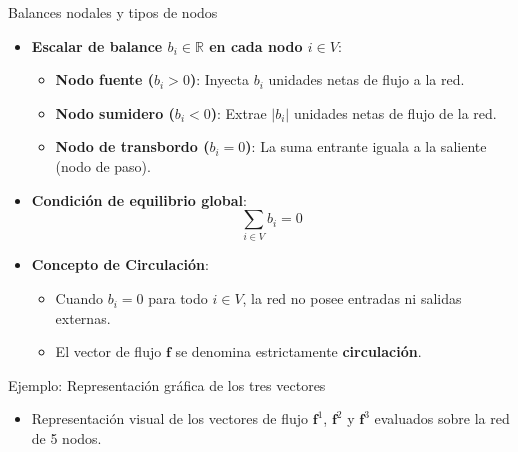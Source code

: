 \documentclass[
  ignorenonframetext,
]{beamer}
\providecommand{\tightlist}{%
  \setlength{\itemsep}{0pt}\setlength{\parskip}{0pt}}
\begin{document}
\begin{frame}{Balances nodales y tipos de nodos}
\label{balances-nodales-y-tipos-de-nodos}
\begin{itemize}
\item
  \textbf{Escalar de balance \(b_i \in \mathbb{R}\) en cada nodo
  \(i \in V\)}:

  \begin{itemize}
  \tightlist
  \item
    \textbf{Nodo fuente (\(b_i > 0\))}: Inyecta \(b_i\) unidades netas
    de flujo a la red.
  \item
    \textbf{Nodo sumidero (\(b_i < 0\))}: Extrae \(|b_i|\) unidades
    netas de flujo de la red.
  \item
    \textbf{Nodo de transbordo (\(b_i = 0\))}: La suma entrante iguala a
    la saliente (nodo de paso).
  \end{itemize}
\item
  \textbf{Condición de equilibrio global}: \[\sum_{i \in V} b_i = 0\]
\item
  \textbf{Concepto de Circulación}:

  \begin{itemize}
  \tightlist
  \item
    Cuando \(b_i = 0\) para todo \(i \in V\), la red no posee entradas
    ni salidas externas.
  \item
    El vector de flujo \(\mathbf{f}\) se denomina estrictamente
    \textbf{circulación}.
  \end{itemize}
\end{itemize}
\end{frame}

\begin{frame}{Ejemplo: Representación gráfica de los tres vectores}
\label{ejemplo-representaciuxf3n-gruxe1fica-de-los-tres-vectores}
\begin{itemize}
\tightlist
\item
  Representación visual de los vectores de flujo \(\mathbf{f}^1\),
  \(\mathbf{f}^2\) y \(\mathbf{f}^3\) evaluados sobre la red de 5 nodos.
\end{itemize}
\end{frame}
\end{document}
